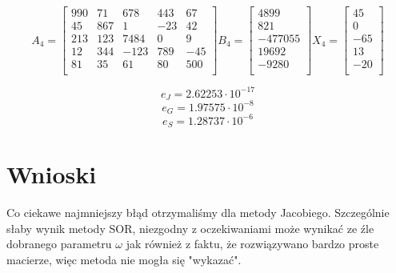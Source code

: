 \documentclass{article}
\begin{document}
\[
A_4 =
\begin{bmatrix}
    990 &  71 &  678 & 443 &  67 \\
     45 & 867 &    1 & -23 &  42 \\
    213 & 123 & 7484 &   0 &   9 \\
     12 & 344 & -123 & 789 & -45 \\
     81 &  35 &   61 &  80 & 500 \\
\end{bmatrix}
B_4 = 
\begin{bmatrix}
    4899    \\
     821    \\
    -477055 \\
    19692   \\
    -9280   \\
\end{bmatrix}
X_4 = 
\begin{bmatrix}
    45  \\
     0  \\
    -65 \\
    13  \\
    -20 \\
\end{bmatrix}
\]
\noindent
{}

\[ e_J = 2.62253 \cdot 10^{-17} \]
\[ e_G = 1.97575 \cdot 10^{-8} \]
\[ e_S = 1.28737 \cdot 10^{-6} \]
\section{Wnioski}
Co ciekawe najmniejszy błąd otrzymaliśmy dla metody Jacobiego. Szczególnie słaby wynik metody SOR, niezgodny z oczekiwaniami może wynikać ze źle dobranego parametru $\omega$ jak również z faktu, że rozwiązywano bardzo proste macierze, więc metoda nie mogła się "wykazać". 
\end{document}
